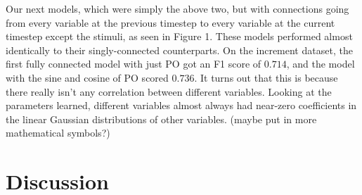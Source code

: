 \documentclass{article} %
\begin{document}
Our next models, which were simply the above two, but with connections going from every variable at the previous timestep to every variable at the current timestep except the stimuli, as seen in Figure 1. These models performed almost identically to their singly-connected counterparts. On the increment dataset, the first fully connected model with just PO got an F1 score of $0.714$, and the model with the sine and cosine of PO scored $0.736$. It turns out that this is because there really isn’t any correlation between different variables. Looking at the parameters learned, different variables almost always had near-zero coefficients in the linear Gaussian distributions of other variables. (maybe put in more mathematical symbols?)

\section{Discussion}
\end{document}
